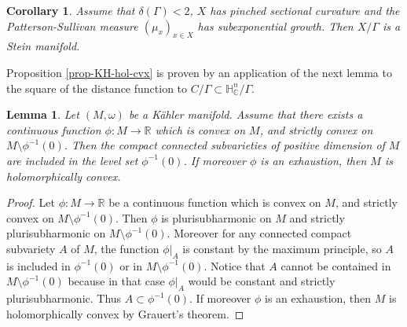 \documentclass{article}
\newtheorem{corollary}[theorem]{Corollary}
\newtheorem{lemma}[theorem]{Lemma}
\theoremstyle{definition}
\theoremstyle{remark}
\newcommand{\C}{\mathbb{C}}
\newcommand{\R}{\mathbb{R}}
\newcommand{\HNC}{\mathbb{H}^{n}_{\C}}
\begin{document}
\begin{corollary}\label{cor:delta-croissance-ssexp}
	Assume that $\delta(\Gamma)<2$, $X$ has pinched sectional curvature and the Patterson-Sullivan measure $(\mu_x)_{x\in X}$ has subexponential growth. Then $X/\Gamma$ is a Stein manifold.
\end{corollary}


Proposition \ref{prop-KH-hol-cvx} is proven by an application of the next lemma to the square of the distance function to $C/\Gamma\subset\HNC/\Gamma$.

\begin{lemma}\label{lem-cvx-psh}
	Let $(M,\omega)$ be a Kähler manifold. Assume that there exists a continuous function $\phi:M\to \R$ which is convex on $M$, and strictly convex on $M\setminus \phi^{-1}(0)$. Then the compact connected subvarieties of positive dimension of $M$ are included in the level set $\phi^{-1}(0)$. If moreover $\phi$ is an exhaustion, then $M$ is holomorphically convex.
\end{lemma}

\begin{proof}
	Let $\phi:M\to \R$ be a continuous function which is convex on $M$, and strictly convex on $M\setminus \phi^{-1}(0)$. Then $\phi$ is plurisubharmonic on $M$ and strictly plurisubharmonic on $M\setminus \phi^{-1}(0)$.  Moreover for any connected compact subvariety $A$ of $M$, the function $\phi\vert_{A}$ is constant by the maximum principle, so $A$ is included in $\phi^{-1}(0)$ or in $M\setminus \phi^{-1}(0)$. Notice that $A$ cannot be contained in $M\setminus \phi^{-1}(0)$ because in that case $\phi\vert_{A}$ would be constant and strictly plurisubharmonic. Thus $A\subset \phi^{-1}(0)$. If moreover $\phi$ is an exhaustion, then $M$ is holomorphically convex by Grauert's theorem.
\end{proof}
\end{document}
